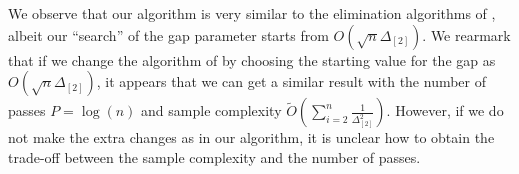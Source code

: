 \begin{remark}
    We observe that our algorithm is very similar to the elimination algorithms of \cite{JinH0X21,KarninKS13}, albeit our ``search'' of the gap parameter starts from $O(\sqrt{n}\Delta_{[2]})$. We rearmark that if we change the algorithm of \cite{JinH0X21,KarninKS13} by choosing the starting value for the gap as \(O(\sqrt{n}\Delta_{[2]})\), it appears that we can get a similar result with the number of passes \(P=\log(n)\) and sample complexity $\tilde{O}(\sum_{i=2}^{n}\frac{1}{\Delta^2_{[2]}})$. However, if we do not make the extra changes as in our algorithm, it is unclear how to obtain the trade-off between the sample complexity and the number of passes.
\end{remark}